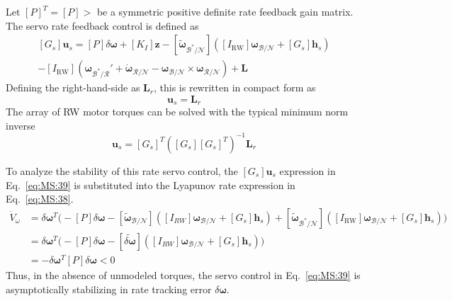 \documentclass[]{AVSSimReportMemo}
\begin{document}
Let $[P]^{T} = [P]>$ be a symmetric positive definite rate feedback gain matrix.  The servo rate feedback control is defined as
\begin{multline}
	\label{eq:MS:39}
	[G_{s}]\bm u_{s} = [P]\delta\bm\omega + [K_{I}]\bm z - [\tilde{\bm\omega}_{\mathcal{B}^{\ast}/\mathcal{N}}] 
	\left( [I_{\text{RW}}] \bm\omega_{\mathcal{B}/\mathcal{N}} + [G_{s}] \bm h_{s} \right)
	\\
	- [I_{\text{RW}}](\bm\omega_{\mathcal{B}^{\ast}/\mathcal{R}} ' +  \dot{\bm\omega}_{\mathcal{R}/\mathcal{N}} -  {\bm\omega}_{\mathcal{B}/\mathcal{N}} \times  \bm\omega_{\mathcal{R}/\mathcal{N}}) + \bm L
\end{multline}
Defining the right-hand-side as $\bm L_{r}$, this is rewritten in compact form as
\begin{equation}
	[G_{s}]\bm u_{s} = \bm L_{r}
\end{equation}
The array of RW motor torques can be solved with the typical minimum norm inverse
\begin{equation}
	\bm u_{s} = [G_{s}]^{T}\left( [G_{s}][G_{s}]^{T}\right)^{-1} \bm L_{r}
\end{equation}


To analyze the stability of this rate servo control, the $[G_{s}]\bm u_{s}$ expression in Eq.~\eqref{eq:MS:39} is substituted into the Lyapunov rate expression in Eq.~\eqref{eq:MS:38}.
\begin{align}
	\label{eq:MS:42}
	\dot V_{\omega} &= \delta\bm\omega^{T} \Big(
		- [P]\delta\bm\omega - [\tilde{\bm \omega}_{\mathcal{B}/\mathcal{N}}] \left( 
	[I_{RW}] \bm\omega_{\mathcal{B}/\mathcal{N}} + [G_{s}] \bm h_{s} 
	\right) 
	+ [\tilde{\bm\omega}_{\mathcal{B}^{\ast}/\mathcal{N}}] 
	\left( [I_{\text{RW}}] \bm\omega_{\mathcal{B}/\mathcal{N}} + [G_{s}] \bm h_{s} \right)
	\Big ) 
	\nonumber \\
	&= \delta\bm\omega^{T} \Big( - [P]\delta\bm\omega
	- [\widetilde{\delta\bm \omega}] \left( 
	[I_{RW}] \bm\omega_{\mathcal{B}/\mathcal{N}} + [G_{s}] \bm h_{s} 
	\right) 
	\Big )
	\nonumber \\
	&= - \delta\bm\omega ^{T} [P] \delta\bm\omega < 0
\end{align}
Thus, in the absence of unmodeled torques, the servo control in Eq.~\eqref{eq:MS:39} is asymptotically stabilizing in rate tracking error $\delta\bm\omega$.  
\end{document}
